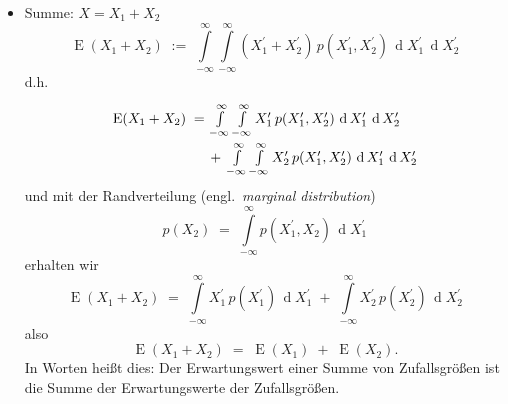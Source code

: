 \begin{itemize}
\item Summe: $X = X_1 + X_2$
\begin{equation}
\operatorname{E}(X_1 + X_2) \; := \;  \int\limits_{-\infty}^{\infty} \int\limits_{-\infty}^{\infty}
(X_1^\prime + X_2^\prime) \, p(X_1^\prime, X_2^\prime) \, \operatorname{d} X_1^\prime \, \operatorname{d} X_2^\prime
\end{equation}
d.h.
\begin{equation}
\arraycolsep=2.0pt\def\arraystretch{2.0}
\begin{array}{ll}
\operatorname{E}(X_1 + X_2) \; = & \int\limits_{-\infty}^{\infty} \int\limits_{-\infty}^{\infty}
X_1^\prime \, p(X_1^\prime, X_2^\prime) \, 
\operatorname{d} X_1^\prime \, \operatorname{d} X_2^\prime\\
& + \; \int\limits_{-\infty}^{\infty} \int\limits_{-\infty}^{\infty} 
X_2^\prime \, p(X_1^\prime, X_2^\prime) \, \operatorname{d} X_1^\prime \, \operatorname{d} X_2^\prime
\end{array}
\end{equation}
und mit der Randverteilung (engl.\ \textsl{marginal distribution}) 
\begin{equation}
p(X_2) \; = \;
\int\limits_{-\infty}^{\infty} p(X_1^\prime, X_2) \, \operatorname{d} X_1^\prime
\label{marginalDistr}
\end{equation}
erhalten wir
\begin{equation}
\operatorname{E}(X_1 + X_2) \; = \; \int\limits_{-\infty}^{\infty}
X_1^\prime \, p(X_1^\prime) \, \operatorname{d} X_1^\prime 
\; + \; \int\limits_{-\infty}^{\infty} 
X_2^\prime \, p(X_2^\prime) \, \operatorname{d} X_2^\prime
\end{equation}
also
\begin{equation}
\operatorname{E}(X_1 + X_2) \; = \; \operatorname{E}(X_1) \; + \; \operatorname{E}(X_2).
\label{EwSummeISTSummeEw}
\end{equation}
In Worten heißt dies: Der Erwartungswert einer Summe von Zufallsgrößen ist die
Summe der Erwartungswerte der Zufallsgrößen.


\end{itemize}
